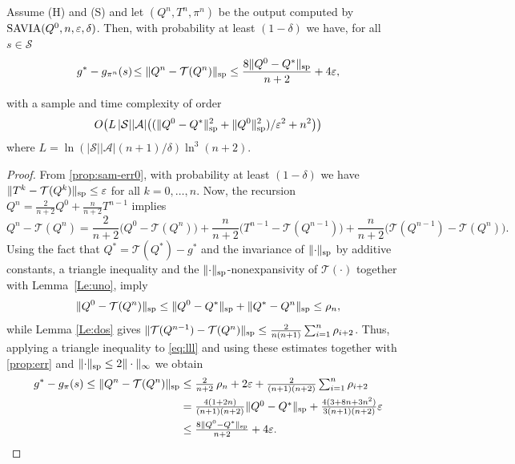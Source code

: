 \documentclass{article}
\newcommand{\cA}{\mathcal{A}}
\newcommand{\cS}{\mathcal{S}}
\newcommand{\T}{\mathcal{T}}
\renewcommand{\sp}[1]{\|{#1}\|_\text{\rm sp}}
\newenvironment{manualtheorem}[1]{%
    \renewcommand\themanualtheoreminner{#1}%
  \manualtheoreminner
}{\endmanualtheoreminner}
\theoremstyle{plain}
\theoremstyle{definition}
\theoremstyle{remark}
\begin{document}
\begin{manualtheorem}{\ref{thm:err}}
Assume \mbox{\sc (H)} and \mbox{\sc (S)} and let $(Q^n,T^n,\pi^n)$ be the output computed by $\mbox{\rm SAVIA}(Q^0,n,\varepsilon,\delta)$. Then, with probability at least $(1-\delta)$ we have, for all $s \in \cS$
\vspace{-1ex}
$$ g^*-g_{\pi^n}(s)\! \leq \sp{Q^n-\T(Q^n)}\leq \frac{8\sp{Q^0-Q^*}}{n+2}+4\varepsilon,$$

\vspace{-2ex}
with a sample and time complexity of order $${O}\big(L\,|\cS||\cA|\big(({\sp{Q^0-Q^*}^{2}+\sp{Q^0}^{2}})/{\varepsilon^{2}}+n^2\big)\big)$$ 
where  
$L=\ln(|\cS||\cA|(n+1)/\delta)\ln^3(n+2)$.
\end{manualtheorem}
\begin{proof}
From \cref{prop:sam-err0}, with probability at least $(1-\delta)$ we have $\sp{T^k-\T(Q^k)}\leq\varepsilon$ for all $k=0,\ldots,n$. Now, the recursion $Q^n=\frac{2}{n+2}Q^0+\frac{n}{n+2}T^{n-1}$ implies
 \begin{equation}\label{eq:lll}
   Q^n-\T(Q^n)
    =\mbox{$\frac{2}{n+2}\big(Q^0-\T(Q^n)\big)+ \frac{n}{n+2}\big(T^{n-1}-\T(Q^{n-1})\big)+ \frac{n}{n+2} \big(\T(Q^{n-1})-\T(Q^n)\big)$}.
\end{equation}
Using the fact that $Q^*=\T(Q^*)-g^*$ and the invariance of $\sp{\cdot}$ by additive constants, a triangle inequality and the $\sp{\cdot}$-nonexpansivity of $\T(\cdot)$ together with Lemma~\ref{Le:uno}, imply 
$$\sp{Q^0-\T(Q^n)} \le \sp{Q^0-Q^*}+\sp{Q^*-Q^n} \le  \rho_n,$$ 
while Lemma \ref{Le:dos} gives $\sp{\T(Q^{n-1})-\T(Q^n)}\leq\frac{2}{n(n+1)}\sum_{i=1}^{n}\rho_{i+2}$. Thus, applying a triangle inequality to \eqref{eq:lll} and using these estimates together with \cref{prop:err} and $\sp{\cdot}\leq 2\|\cdot\|_\infty$ we obtain
\begin{align*}
   g^*-g_\pi(s)\leq  \sp{Q^n-\T(Q^n)}&\le \mbox{$\frac{2}{n+2}\,\rho_n+ 2\varepsilon+\frac{2}{(n+1)(n+2)}\sum_{i=1}^{n}\rho_{i+2}$}
   \\& = \mbox{$\frac{4(1+2n)}{(n+1)(n+2)}\sp{Q^0-Q^*}+ \frac{4(3+8n+3n^2)}{3(n+1)(n+2)}\varepsilon$}
    \\& \le \mbox{$\frac{8\sp{Q^0-Q^*}}{n+2}+4\varepsilon$}.
\end{align*}


\end{proof}
\end{document}
